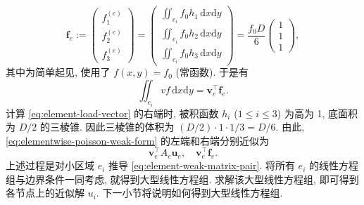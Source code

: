 \begin{equation}\label{eq:element-load-vector}
\boldsymbol{f}_e:=\begin{pmatrix}f_1^{(e)}\\f_2^{(e)}\\f_3^{(e)}\end{pmatrix}
=\begin{pmatrix}\iint_{e_i}f_0h_1\,\mathrm dx\mathrm dy\\\iint_{e_i}f_0h_2\,\mathrm dx\mathrm dy\\\iint_{e_i}f_0h_3\,\mathrm dx\mathrm dy\end{pmatrix}
=\frac{f_0D}{6}\begin{pmatrix}1\\1\\1\end{pmatrix},
\end{equation}
{其中为简单起见, 使用了 $f(x,y)=f_0$ (常函数). 于是有}
\[\iint_{e_i}vf\,\mathrm dx\mathrm dy=\boldsymbol{v}_e^{\top}\boldsymbol{f}_e.\]
{计算 \eqref{eq:element-load-vector} 的右端时, 被积函数 $h_i$ ($1\le i\le3$) 为高为 1, 底面积为 $D/2$ 的三棱锥. 因此三棱锥的体积为 $(D/2)\cdot1\cdot1/3=D/6$. 由此, \eqref{eq:elementwise-poisson-weak-form} 的左端和右端分别近似为}
\begin{equation}\label{eq:element-weak-matrix-pair}
\boldsymbol{v}_e^{\top}A_e\boldsymbol{u}_e,\quad\boldsymbol{v}_e^{\top}\boldsymbol{f}_e.
\end{equation}
{上述过程是对小区域 $e_i$ 推导 \eqref{eq:element-weak-matrix-pair}. 将所有 $e_i$ 的线性方程组与边界条件一同考虑, 就得到大型线性方程组. 求解该大型线性方程组, 即可得到各节点上的近似解 $u_i$. 下一小节将说明如何得到大型线性方程组.}
